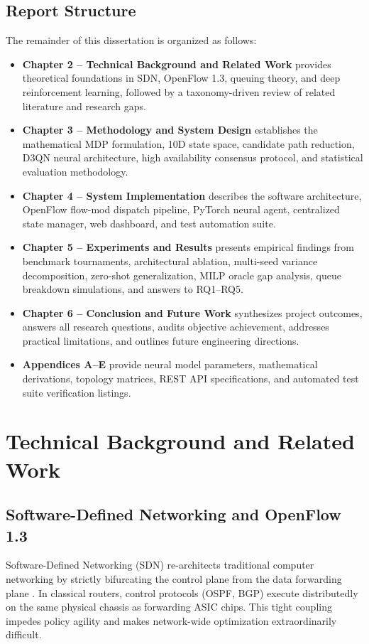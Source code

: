 \documentclass[12pt,a4paper,oneside]{report}
\begin{document}
\section{Report Structure}
The remainder of this dissertation is organized as follows:
\begin{itemize}[leftmargin=8mm]
  \item \textbf{Chapter 2 -- Technical Background and Related Work} provides theoretical foundations in SDN, OpenFlow 1.3, queuing theory, and deep reinforcement learning, followed by a taxonomy-driven review of related literature and research gaps.
  \item \textbf{Chapter 3 -- Methodology and System Design} establishes the mathematical MDP formulation, 10D state space, candidate path reduction, D3QN neural architecture, high availability consensus protocol, and statistical evaluation methodology.
  \item \textbf{Chapter 4 -- System Implementation} describes the software architecture, OpenFlow flow-mod dispatch pipeline, PyTorch neural agent, centralized state manager, web dashboard, and test automation suite.
  \item \textbf{Chapter 5 -- Experiments and Results} presents empirical findings from benchmark tournaments, architectural ablation, multi-seed variance decomposition, zero-shot generalization, MILP oracle gap analysis, queue breakdown simulations, and answers to RQ1--RQ5.
  \item \textbf{Chapter 6 -- Conclusion and Future Work} synthesizes project outcomes, answers all research questions, audits objective achievement, addresses practical limitations, and outlines future engineering directions.
  \item \textbf{Appendices A--E} provide neural model parameters, mathematical derivations, topology matrices, REST API specifications, and automated test suite verification listings.
\end{itemize}

\chapter{Technical Background and Related Work}
\label{chap:background}

\section{Software-Defined Networking and OpenFlow 1.3}
Software-Defined Networking (SDN) re-architects traditional computer networking by strictly bifurcating the control plane from the data forwarding plane \cite{mckeown2008openflow}. In classical routers, control protocols (OSPF, BGP) execute distributedly on the same physical chassis as forwarding ASIC chips. This tight coupling impedes policy agility and makes network-wide optimization extraordinarily difficult.
\end{document}
